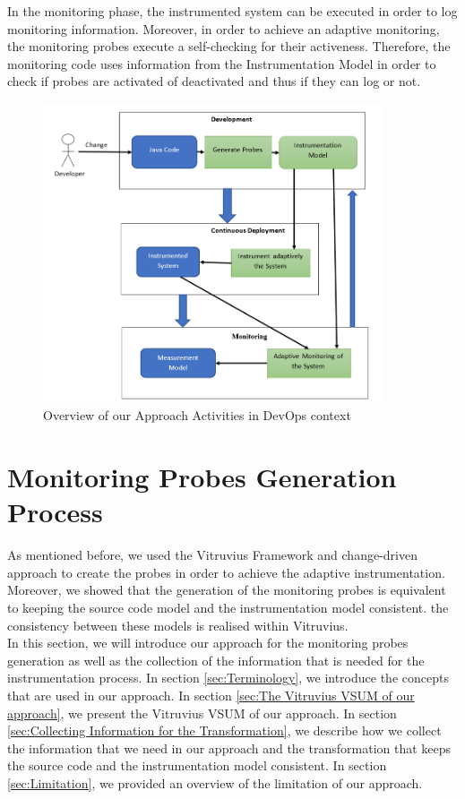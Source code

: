 In the monitoring phase, the instrumented system can be executed in order to log monitoring information. Moreover, in order to achieve an adaptive monitoring, the monitoring probes execute a self-checking for their activeness. Therefore, the monitoring code uses information from the Instrumentation Model in order to check if probes are activated of deactivated and thus if they can log or not. \\


\begin{figure}[h]
\centering
\includegraphics[width=0.9\textwidth]{figures/devops_approach}
\caption{Overview of our Approach Activities in DevOps context}
\label{fig:devops_approach}
\end{figure}

\section{Monitoring Probes Generation Process}
\label{sec:Monitoring Probes Generation Process}
As mentioned before, we used the Vitruvius Framework and change-driven approach to create the probes in order to achieve the adaptive instrumentation. Moreover, we showed that the generation of the monitoring probes is equivalent to keeping the source code model and the instrumentation model consistent. the consistency between these models is realised within Vitruvius.\\

In this section, we will introduce our approach for the monitoring probes generation as well as the collection of the information that is needed for the instrumentation process. In section \ref{sec:Terminology}, we introduce the concepts that are used in our approach. In section \ref{sec:The Vitruvius VSUM of our approach}, we present the Vitruvius VSUM of our approach. In section \ref{sec:Collecting Information for the Transformation}, we describe how we collect the information that we need in our approach and the transformation that keeps the source code and the instrumentation model consistent. In section \ref{sec:Limitation}, we provided an overview of the limitation of our approach.\\

